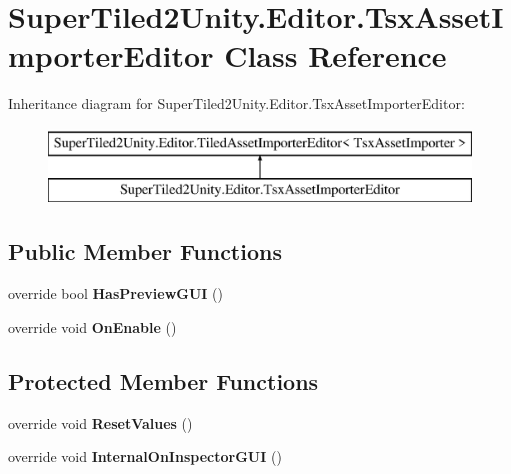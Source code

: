 \hypertarget{class_super_tiled2_unity_1_1_editor_1_1_tsx_asset_importer_editor}{}\section{Super\+Tiled2\+Unity.\+Editor.\+Tsx\+Asset\+Importer\+Editor Class Reference}
\label{class_super_tiled2_unity_1_1_editor_1_1_tsx_asset_importer_editor}
Inheritance diagram for Super\+Tiled2\+Unity.\+Editor.\+Tsx\+Asset\+Importer\+Editor\+:\begin{figure}[H]
\begin{center}
\leavevmode
\includegraphics[height=2.000000cm]{class_super_tiled2_unity_1_1_editor_1_1_tsx_asset_importer_editor}
\end{center}
\end{figure}
\subsection*{Public Member Functions}
\begin{DoxyCompactItemize}
\item 
\mbox{\label{class_super_tiled2_unity_1_1_editor_1_1_tsx_asset_importer_editor_a1077b3136db8594b35756471998a25e2}} 
override bool {\bfseries Has\+Preview\+G\+UI} ()
\item 
\mbox{\label{class_super_tiled2_unity_1_1_editor_1_1_tsx_asset_importer_editor_a2048b38808124e74a9d86e3e454a6dcf}} 
override void {\bfseries On\+Enable} ()
\end{DoxyCompactItemize}
\subsection*{Protected Member Functions}
\begin{DoxyCompactItemize}
\item 
\mbox{\label{class_super_tiled2_unity_1_1_editor_1_1_tsx_asset_importer_editor_acf3cdb9a7c1f110a96482983a5376069}} 
override void {\bfseries Reset\+Values} ()
\item 
\mbox{\label{class_super_tiled2_unity_1_1_editor_1_1_tsx_asset_importer_editor_a6100a25ebb27dcd90a9ccdeb70c702ae}} 
override void {\bfseries Internal\+On\+Inspector\+G\+UI} ()
\end{DoxyCompactItemize}
